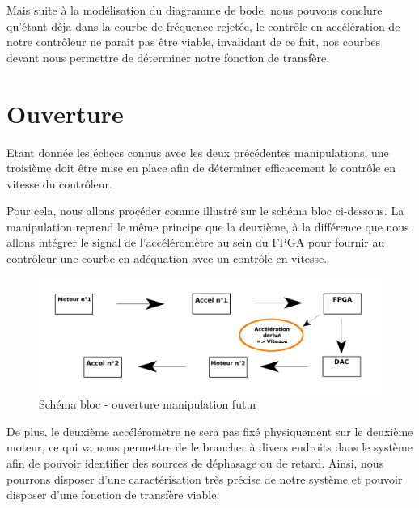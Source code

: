 \documentclass[french,a4paper,12pt]{report}
\begin{document}
			Mais suite à la modélisation du diagramme de bode, nous pouvons conclure qu'étant déja dans la courbe de fréquence rejetée, le contrôle en accélération de notre contrôleur ne paraît pas être viable, invalidant de ce fait, nos courbes devant nous permettre de déterminer notre fonction de transfère.
			
\newpage
			
		\chapter{Ouverture}
	
		Etant donnée les échecs connus avec les deux précédentes manipulations, une troisième doit être mise en place afin de déterminer efficacement le contrôle en vitesse du contrôleur.
		
		Pour cela, nous allons procéder comme illustré sur le schéma bloc ci-dessous. La manipulation reprend le même principe que la deuxième, à la différence que nous allons intégrer le signal de l'accéléromètre au sein du FPGA pour fournir au contrôleur une courbe en adéquation avec un contrôle en vitesse.
		
	\begin{figure}[!ht]
    \center
  	\includegraphics[width=18cm]{manip3.png}
    \caption{Schéma bloc - ouverture manipulation futur}
	\end{figure}
	
	De  plus, le deuxième accéléromètre ne sera pas fixé physiquement sur le deuxième moteur, ce qui va nous permettre de le brancher à divers endroits dans le système afin de pouvoir identifier des sources de déphasage ou de retard. Ainsi, nous pourrons disposer d'une caractérisation très précise de notre système et pouvoir disposer d'une fonction de transfère viable.
	
	
	
%
%
\end{document}
